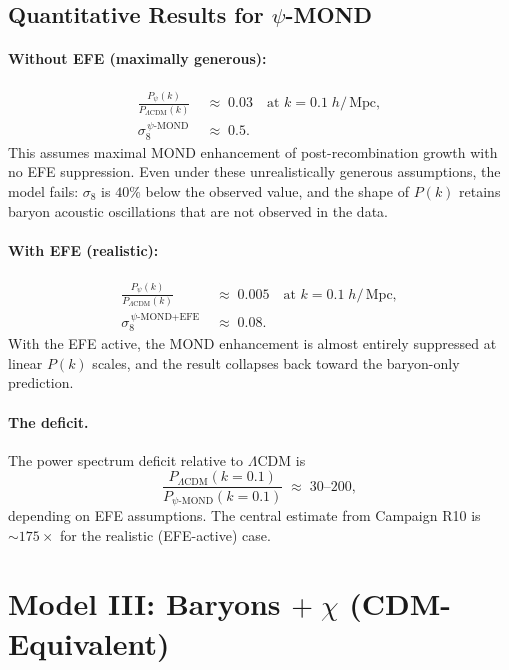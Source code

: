 \documentclass[12pt,a4paper]{article}
\newcommand{\Mpc}{\,\mathrm{Mpc}}
\newcommand{\LCDM}{\Lambda\mathrm{CDM}}
\begin{document}
\subsection{Quantitative Results for $\psi$-MOND}

\paragraph{Without EFE (maximally generous):}
\begin{align}
  \frac{P_{\psi}(k)}{P_{\LCDM}(k)}
  &\;\approx\; 0.03
  \quad\text{at } k = 0.1\;h/\Mpc, \\
  \sigma_8^{\,\psi\text{-MOND}} &\;\approx\; 0.5.
\end{align}
This assumes maximal MOND enhancement of post-recombination growth with
no EFE suppression. Even under these unrealistically generous
assumptions, the model fails: $\sigma_8$ is $40\%$ below the observed
value, and the shape of $P(k)$ retains baryon acoustic oscillations
that are not observed in the data.

\paragraph{With EFE (realistic):}
\begin{align}
  \frac{P_{\psi}(k)}{P_{\LCDM}(k)}
  &\;\approx\; 0.005
  \quad\text{at } k = 0.1\;h/\Mpc, \\
  \sigma_8^{\,\psi\text{-MOND+EFE}} &\;\approx\; 0.08.
\end{align}
With the EFE active, the MOND enhancement is almost entirely suppressed
at linear $P(k)$ scales, and the result collapses back toward the
baryon-only prediction.

\paragraph{The deficit.} The power spectrum deficit relative to $\LCDM$ is
\begin{equation}
  \boxed{
  \frac{P_{\LCDM}(k=0.1)}{P_{\psi\text{-MOND}}(k=0.1)}
  \;\approx\; 30\text{--}200,
  }
\end{equation}
depending on EFE assumptions. The central estimate from Campaign R10 is
$\sim\!175\times$ for the realistic (EFE-active) case.

\section{Model III: Baryons $+\;\chi$ (CDM-Equivalent)}
\label{sec:chi_alone}
\end{document}
